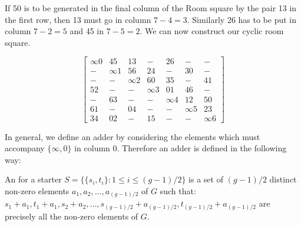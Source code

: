 If 50 is to be generated in the final column of the Room square by the pair 13 in the first row, then 13 must go in column $7 - 4 = 3$.
Similarly 26 has to be put in column $7 - 2 = 5$ and 45 in $7 - 5 = 2$.
We can now construct our cyclic room square.

\begin{equation}
  \begin{bmatrix}
    \infty 0 &  45 &  13 &   - &  26 &   - &   - \\
     - &  \infty 1 &  56 &  24 &   - &  30 &   - \\
     - &   - &  \infty 2 &  60 &  35 &   - &  41 \\
    52 &   - &   - &  \infty 3 &  01 &  46 &   - \\
     - &  63 &   - &   - &  \infty 4 &  12 &  50 \\
    61 &   - &  04 &   - &   - &  \infty 5 &  23 \\
    34 &  02 &   - &  15 &   - &   - &  \infty 6 
  \end{bmatrix}
  \label{eq:cyclic-room}
\end{equation}

In general, we define an adder by considering the elements which must accompany $\{\infty, 0\}$ in column 0.
Therefore an adder is defined in the following way:

An  for a starter
$S = \{\{s_i, t_i\}: 1 \leq i \leq (g - 1)/2 \}$
is a set of $(g - 1)/2$ distinct non-zero elements
$a_1, a_2, ..., a_{(g - 1)/2}$ of $G$ such that:
$s_1 + a_1, t_1 + a_1, s_2 + a_2, \ldots, s_{(g - 1)/2} + a_{(g - 1)/2}, t_{(g - 1)/2} + a_{(g - 1)/2}$
are precisely all the non-zero elements of $G$.

